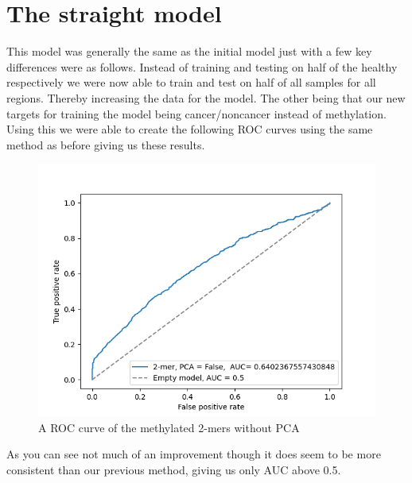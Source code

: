 \chapter{The straight model}
This model was generally the same as the initial model just with a few key differences were as follows. Instead of training and testing on half of the healthy respectively we were now able to train and test on half of all samples for all regions. Thereby increasing the data for the model. The other being that our new targets for training the model being cancer/noncancer instead of methylation. 
Using this we were able to create the following ROC curves using the same method as before giving us these results.
\begin{figure}[H]
	\centering
	\includegraphics[width=0.7\linewidth]{../../figures/straight_model/ROC/2-mer, PCA = False.png}
	\caption{A ROC curve of the methylated 2-mers without PCA}
	\label{fig:allhealthy2}
\end{figure}
As you can see not much of an improvement though it does seem to be more consistent than our previous method, giving us only AUC above 0.5. 
